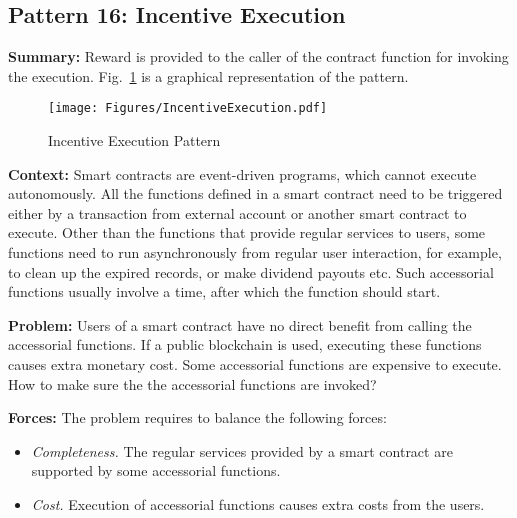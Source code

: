
\subsection{ \textbf{Pattern 16: Incentive Execution}}
\label{sec:incentiveexecution}

\noindent \textbf{Summary:} Reward is provided to the caller of the contract function for invoking the execution. Fig.~\ref{fig:incentiveexecution} is a graphical representation of the pattern.

\begin{figure}[t]
\begin{center}
\texttt{[image: Figures/IncentiveExecution.pdf]}
\caption{Incentive Execution Pattern}\label{fig:incentiveexecution}
\end{center}
\end{figure}

\vspace{0.5em}\noindent \textbf{Context:} 
Smart contracts are event-driven programs, which cannot execute autonomously. All the functions defined in a smart contract need to be triggered either by a transaction from external account or another smart contract to execute. Other than the functions that provide regular services to users, some functions need to run asynchronously from regular user interaction, for example, to clean up the expired records, or make dividend payouts etc. Such accessorial functions usually involve a time, after which the function should start.

\vspace{0.5em}\noindent \textbf{Problem:} 
Users of a smart contract have no direct benefit from calling the accessorial functions. If a public blockchain is used, executing these functions causes extra monetary cost. Some accessorial functions are expensive to execute. How to make sure the the accessorial functions are invoked?

\vspace{0.5em}\noindent \textbf{Forces:} The problem requires to balance the following forces:
\begin{itemize}
  \item \textit{Completeness.} The regular services provided by a smart contract are supported by some accessorial functions.
  \item \textit{Cost.} Execution of accessorial functions causes extra costs from the users.
\end{itemize}


